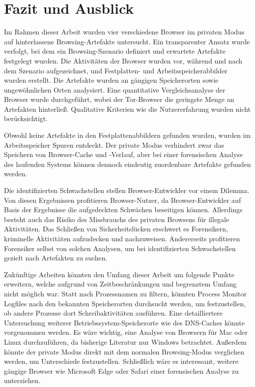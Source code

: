 \chapter{Fazit und Ausblick}\label{chap:Fazit-Ausblick}
\thispagestyle{plain.scrheadings}
\ohead{\headmark}

Im Rahmen dieser Arbeit wurden vier verschiedene Browser im privaten Modus auf hinterlassene Browsing-Artefakte untersucht. Ein transparenter Ansatz wurde verfolgt, bei dem ein Browsing-Szenario definiert und erwartete Artefakte festgelegt wurden. Die Aktivitäten der Browser wurden vor, während und nach dem Szenario aufgezeichnet, und Festplatten- und Arbeitsspeicherabbilder wurden erstellt. Die Artefakte wurden an gängigen Speicherorten sowie ungewöhnlichen Orten analysiert. Eine quantitative Vergleichsanalyse der Browser wurde durchgeführt, wobei der Tor-Browser die geringste Menge an Artefakten hinterließ. Qualitative Kriterien wie die Nutzererfahrung wurden nicht berücksichtigt.

Obwohl keine Artefakte in den Festplattenabbildern gefunden wurden, wurden im Arbeitsspeicher Spuren entdeckt. Der private Modus verhindert zwar das Speichern von Browser-Cache und -Verlauf, aber bei einer forensischen Analyse des laufenden Systems können dennoch eindeutig zuordenbare Artefakte gefunden werden.

Die identifizierten Schwachstellen stellen Browser-Entwickler vor einem Dilemma.
Von diesen Ergebnissen profitieren Browser-Nutzer, da Browser-Entwickler auf Basis der Ergebnisse die aufgedeckten Schwächen beseitigen können.
Allerdings besteht auch das Risiko des Missbrauchs des privaten Browsens für illegale Aktivitäten.
Das Schließen von Sicherheitslücken erschwert es Forensikern, kriminelle Aktivitäten aufzudecken und nachzuweisen. 
Andererseits profitieren Forensiker selbst von solchen Analysen, um bei identifizierten Schwachstellen gezielt nach Artefakten zu suchen. 

Zukünftige Arbeiten könnten den Umfang dieser Arbeit um folgende Punkte erweitern, welche aufgrund von Zeitbeschränkungen und begrenztem Umfang nicht möglich war. Statt nach Prozessnamen zu filtern, könnten Process Monitor Logfiles nach den bekannten Speicherorten durchsucht werden, um festzustellen, ob andere Prozesse dort Schreibaktivitäten ausführen. Eine detailliertere Untersuchung weiterer Betriebssystem-Speicherorte wie des DNS-Caches könnte vorgenommen werden. Es wäre wichtig, eine Analyse von Browsern für Mac oder Linux durchzuführen, da bisherige Literatur nur Windows betrachtet. Außerdem könnte der private Modus direkt mit dem normalen Browsing-Modus verglichen werden, um Unterschiede festzustellen. Schließlich wäre es interessant, weitere gängige Browser wie Microsoft Edge oder Safari einer forensischen Analyse zu unterziehen.

